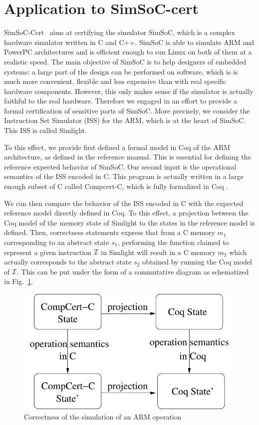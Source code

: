 \section{Application to SimSoC-cert}
\label{sec:simsoccert}

SimSoC-Cert~\cite{rapido11,cpp11} aims at certifying the simulator SimSoC, 
which is a complex hardware simulator written in C and C++.
SimSoC is able to simulate ARM and PowerPC architectures and is 
efficient enough to run Linux on both of them at a realistic speed.
The main objective of SimSoC is to help designers of embedded systems:
a large part of the design can be performed on software,
which is is much more convenient, flexible and less expensive
than with real specific hardware components.
However, 
this only makes sense if the simulator is actually faithful to the real
hardware.
Therefore we engaged in an effort to provide a formal certification
of sensitive parts of SimSoC.
More precisely, we consider the Instruction Set Simulator (ISS)
for the ARM, which is at the heart of SimSoC.
This ISS is called Simlight.

To this effect, we provide first defined a formal model in Coq of the ARM
architecture, as defined in the reference manual.
This is essential for defining the reference expected behavior
of SimSoC.
Our second input is the operational semantics of the ISS
encoded in C. 
This program is actually written in a large enough subset of C
called Compcert-C,
which is fully formalized in Coq \cite{Leroy-Compcert-CACM}.

We can then compare the behavior of the ISS encoded in C 
with the expected reference model directly defined in Coq.
To this effect, a projection between the Coq model of the
memory state of Simlight to the states in the reference model
is defined.
Then, correctness statements express that from a 
C memory $m_1$ corresponding to an abstract state $s_1$,
performing the function claimed to represent a given instruction $\cal I$
in Simlight 
will result in a C memory $m_2$ which actually corresponds 
to the abstract state $s_2$ obtained by
running the Coq model of $\cal I$. 
This can be put under the form of a commutative diagram as
schematized in Fig.~\ref{fig:thrm}.

\begin{figure}
\hfil\includegraphics[width=.5\linewidth]{theorem.pdf}
\caption{Correctness of the simulation of an ARM operation}
\label{fig:thrm}
\end{figure}

